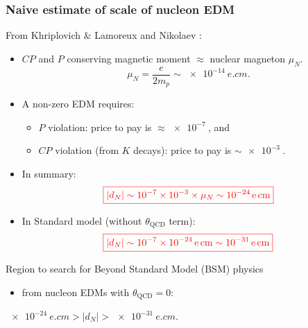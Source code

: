 \begin{frame}
\frametitle{Naive estimate of scale of nucleon EDM}

\vspace{-0.5cm}
\begin{block}{From Khriplovich \& Lamoreux \textcolor{PineGreen}{\cite{Khriplovich:1997ga}} and Nikolaev \textcolor{PineGreen}{\cite{Rathmann:2013rqa}}:}
\begin{itemize}
  \item $CP$ and $P$ conserving magnetic moment $\approx$ nuclear magneton $\mu_N$.
  \begin{equation}
     \mu_N = \frac{e}{2m_p} \sim \SI{e-14}{e.cm}. \nonumber
  \end{equation}
  \vspace{-0.4cm}
  \item A non-zero EDM requires:
  \begin{itemize}
   \item $P$ violation: price to pay is $\approx \SI{e-7}{}$, and
   \item $CP$ violation (from $K$ decays): price to pay is $\sim \SI{e-3}{}$.
  \end{itemize}
  \item In summary: 
  \begin{equation}
   \textcolor{red}{\boxed{|d_N| \sim \num{e-7} \times \num{e-3} \times \mu_N \sim \SI{e-24}{e.cm}}}\nonumber
  \end{equation}
  \item In Standard model (without $\theta_\text{QCD}$ term):    
    \begin{equation}
      \textcolor{red}{\boxed{|d_N| \sim \num{e-7} \times \SI{e-24}{e.cm}  \sim \SI{e-31}{e.cm}}}   \nonumber  
    \end{equation}
 \end{itemize}
\end{block}

\vspace{-0.3cm}
\begin{alertblock}{Region to search for Beyond Standard Model (BSM) physics  }
\begin{itemize}
 \item from nucleon EDMs with $\theta_\text{QCD}=0$:
\end{itemize}
 \centering $\boxed{\SI{e-24}{e.cm} > |d_N| > \SI{e-31}{e.cm}}$.
\end{alertblock}

\end{frame}

